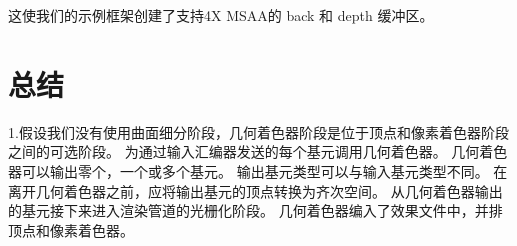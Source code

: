 \begin{flushleft}
这使我们的示例框架创建了支持4X MSAA的 back 和 depth 缓冲区。
\end{flushleft}

\section{总结}
\begin{flushleft}
1.假设我们没有使用曲面细分阶段，几何着色器阶段是位于顶点和像素着色器阶段之间的可选阶段。 为通过输入汇编器发送的每个基元调用几何着色器。 几何着色器可以输出零个，一个或多个基元。 输出基元类型可以与输入基元类型不同。 在离开几何着色器之前，应将输出基元的顶点转换为齐次空间。 从几何着色器输出的基元接下来进入渲染管道的光栅化阶段。 几何着色器编入了效果文件中，并排顶点和像素着色器。\\
\end{flushleft}






